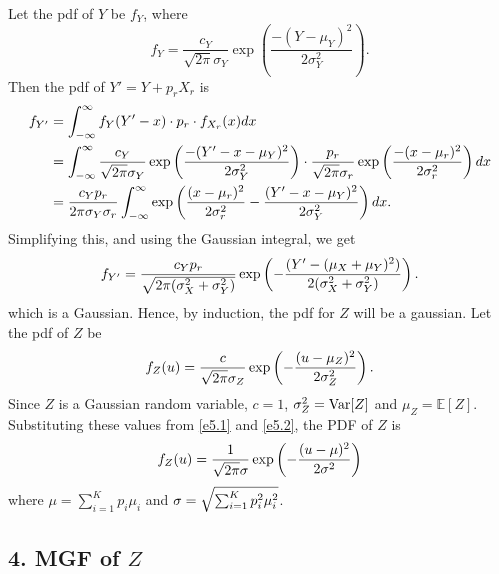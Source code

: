 Let the pdf of $Y$ be $f_Y$, where
\begin{equation*}
    f_Y = \frac{c_Y}{\sqrt{2\pi}\sigma_Y}\exp\left(\frac{-(Y-\mu_Y)^2}
    {2\sigma_Y^2}\right).
\end{equation*}
Then the pdf of $Y'=Y+p_{r}X_{r}$ is
\begin{equation*}
    \begin{aligned}
        f_{Y'} &= \int_{-\infty}^{\infty}f_Y(Y'-x)\cdot p_r\cdot f_{X_{r}}(x)dx \\
        &= \int_{-\infty}^{\infty}\frac{c_Y}
        {\sqrtsign{2\pi}\sigma_Y}\exp\left(\frac{-(Y'-x-\mu_Y)^2}
        {2\sigma_Y^2}\right)\cdot \frac{p_r}
        {\sqrtsign{2\pi}\sigma_{r}}\exp\left(\frac{-(x-\mu_{r})^2}
        {2\sigma_{r}^2}\right)dx \\
        &= \frac{c_Yp_r}{2\pi\sigma_Y\sigma_r}
        \int_{-\infty}^{\infty}\exp\left(\frac{(x-\mu_r)^2}{2\sigma_r^2} -
        \frac{(Y'-x-\mu_Y)^2}{2\sigma_Y^2}\right)dx.
    \end{aligned}
\end{equation*}
Simplifying this, and using the Gaussian integral, we get 
\begin{equation*}
    f_{Y'} = \frac{c_Yp_r}{\sqrtsign{2\pi(\sigma_X^2+\sigma_Y^2)}}
    \exp\left(-\frac{(Y'-(\mu_X+\mu_Y)^2)}{2(\sigma_X^2+\sigma_Y^2)}\right).
\end{equation*}
which is a Gaussian. Hence, by induction, the pdf for $Z$ will be a gaussian. Let
the pdf of $Z$ be 
\begin{equation*}
    f_Z(u) = \frac{c}{\sqrtsign{2\pi}\sigma_Z}\exp\left(-\frac{(u-\mu_Z)^2}
    {2\sigma_Z^2}\right).
\end{equation*}
Since $Z$ is a Gaussian random variable, $c=1$, $\sigma_Z^2 = \text{Var}[Z]$ and
$\mu_Z=\mathbb{E}[Z]$. Substituting these values from \ref{e5.1} and \ref{e5.2},
the PDF of $Z$ is
\begin{equation}
    f_Z(u) = \frac{1}{\sqrtsign{2\pi}\sigma}\exp\left(-\frac{(u-\mu)^2}
    {2\sigma^2}\right)
    \label{e5.3}
\end{equation}
where $\mu = \sum_{i=1}^{K}p_i\mu_i$ and
$\sigma = \sqrtsign{\sum_{i=1}^{K}p_i^2\mu_i^2}$. 


\subsection*{4. MGF of $Z$}

